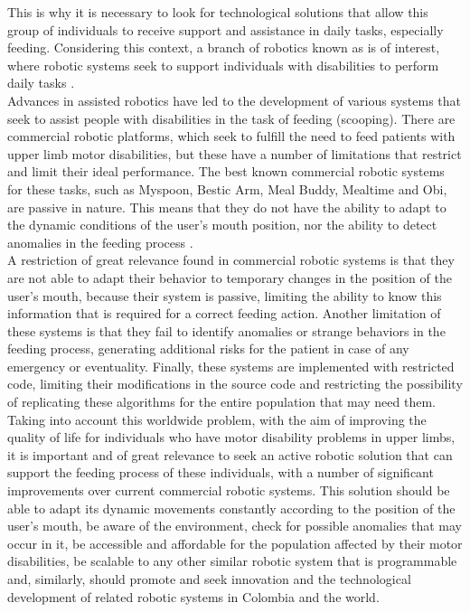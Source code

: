 \documentclass[11pt]{report} %
\begin{document}
This is why it is necessary to look for technological solutions that allow this group of individuals to receive support and assistance in daily tasks, especially feeding. Considering this context, a branch of robotics known as  is of interest, where robotic systems seek to support individuals with disabilities to perform daily tasks \citep{cite_assited_robotics_stanford_lecture_jaffe}.\\

Advances in assisted robotics have led to the development of various systems that seek to assist people with disabilities in the task of feeding (scooping). There are commercial robotic platforms, which seek to fulfill the need to feed patients with upper limb motor disabilities, but these have a number of limitations that restrict and limit their ideal performance. The best known commercial robotic systems for these tasks, such as Myspoon, Bestic Arm, Meal Buddy, Mealtime and Obi, are passive in nature. This means that they do not have the ability to adapt to the dynamic conditions of the user's mouth position, nor the ability to detect anomalies in the feeding process \citep{cite_park_active_robot_assisted_feeding}.\\

A restriction of great relevance found in commercial robotic systems is that they are not able to adapt their behavior to temporary changes in the position of the user's mouth, because their system is passive, limiting the ability to know this information that is required for a correct feeding action. Another limitation of these systems is that they fail to identify anomalies or strange behaviors in the feeding process, generating additional risks for the patient in case of any emergency or eventuality. Finally, these systems are implemented with restricted code, limiting their modifications in the source code and restricting the possibility of replicating these algorithms for the entire population that may need them.\\

Taking into account this worldwide problem, with the aim of improving the quality of life for individuals who have motor disability problems in upper limbs, it is important and of great relevance to seek an active robotic solution that can support the feeding process of these individuals, with a number of significant improvements over current commercial robotic systems. This solution should be able to adapt its dynamic movements constantly according to the position of the user's mouth, be aware of the environment, check for possible anomalies that may occur in it, be accessible and affordable for the population affected by their motor disabilities, be scalable to any other similar robotic system that is programmable and, similarly, should promote and seek innovation and the technological development of related robotic systems in Colombia and the world.\\
\end{document}
